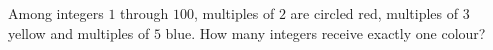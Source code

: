 Among integers $1$ through $100$, multiples of $2$ are circled red, multiples of $3$ yellow and multiples of $5$ blue. How many integers receive exactly one colour?
